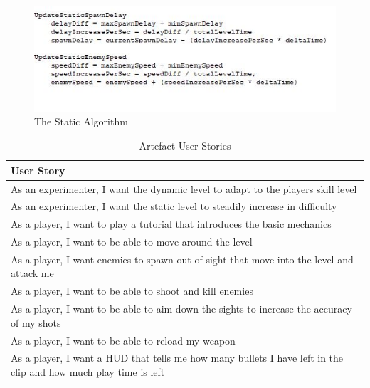 \documentclass[journal]{IEEEtran}
\begin{document}
\begin{figure}[h]
	\includegraphics[width=2.0\linewidth]{pseudocodestatic.jpg}
	\caption{The Static Algorithm}
	\label{fig::24}
\end{figure} 


\begin{table}[t]
\centering
\caption{Artefact User Stories}
\label{tab:my-table}
\begin{tabular}{|l|}
\hline
\textbf{User Story}                                                                                                    \\ \hline
As an experimenter, I want the dynamic level to adapt to the players skill level                                       \\ \hline
As an experimenter, I want the static level to steadily increase in difficulty                                         \\ \hline
As a player, I want to play a tutorial that introduces the basic mechanics                                             \\ \hline
As a player, I want to be able to move around the level                                                                \\ \hline
As a player, I want enemies to spawn out of sight that move into the level and attack me                               \\ \hline
As a player, I want to be able to shoot and kill enemies                                                               \\ \hline
As a player, I want to be able to aim down the sights to increase the accuracy of my shots                             \\ \hline
As a player, I want to be able to reload my weapon                                                                     \\ \hline
As a player, I want a HUD that tells me how many bullets I have left in the clip and how much play time is left        \\ \hline

\end{tabular}
\end{table}
\end{document}
